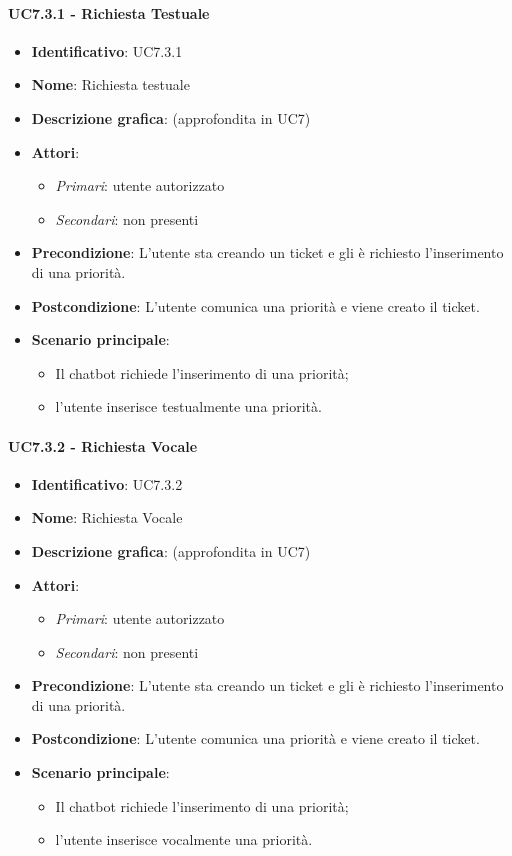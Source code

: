 \paragraph{UC7.3.1 - Richiesta Testuale}
\begin{itemize}
   \item \textbf{Identificativo}: UC7.3.1
   \item \textbf{Nome}: Richiesta testuale
   \item \textbf{Descrizione grafica}: (approfondita in UC7)
   \item \textbf{Attori}:
   \begin{itemize} 
       \item \textit{Primari}: utente autorizzato
       \item \textit{Secondari}: non presenti
   \end{itemize}
       \item \textbf{Precondizione}: L'utente sta creando un ticket e gli è richiesto l'inserimento di una priorità.
       \item \textbf{Postcondizione}: L'utente comunica una priorità e viene creato il ticket. 
    \item \textbf{Scenario principale}: 
       \begin{itemize}
           \item Il chatbot richiede l'inserimento di una priorità;
           \item l'utente inserisce testualmente una priorità.
       \end{itemize}
\end{itemize}

\paragraph{UC7.3.2 - Richiesta Vocale}
\begin{itemize}
   \item \textbf{Identificativo}: UC7.3.2
   \item \textbf{Nome}: Richiesta Vocale
   \item \textbf{Descrizione grafica}: (approfondita in UC7)
   \item \textbf{Attori}:
   \begin{itemize} 
       \item \textit{Primari}: utente autorizzato
       \item \textit{Secondari}: non presenti
   \end{itemize}
   \item \textbf{Precondizione}: L'utente sta creando un ticket e gli è richiesto l'inserimento di una priorità.
   \item \textbf{Postcondizione}: L'utente comunica una priorità e viene creato il ticket. 
    \item \textbf{Scenario principale}: 
       \begin{itemize}  
        \item Il chatbot richiede l'inserimento di una priorità;
        \item l'utente inserisce vocalmente una priorità.
       \end{itemize}
\end{itemize}

